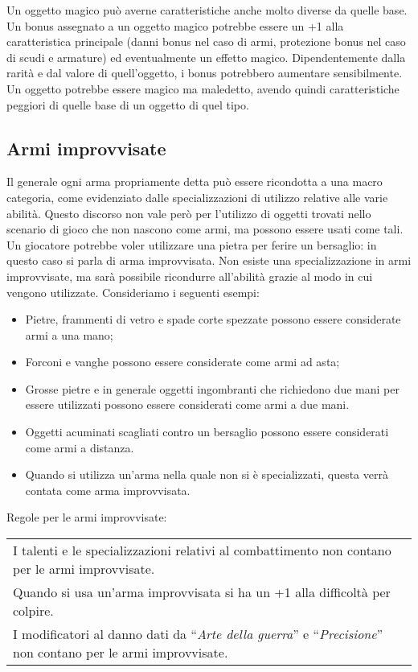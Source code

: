\documentclass[../manuale_main.tex]{subfiles}
\begin{document}
Un oggetto magico può averne caratteristiche anche molto diverse da quelle base.
Un bonus assegnato a un oggetto magico potrebbe essere un +1 alla caratteristica principale (danni bonus nel caso di armi, protezione bonus nel caso di scudi e armature) ed eventualmente un effetto magico.
Dipendentemente dalla rarità e dal valore di quell'oggetto, i bonus potrebbero aumentare sensibilmente.
Un oggetto potrebbe essere magico ma maledetto, avendo quindi caratteristiche peggiori di quelle base di un oggetto di quel tipo.


\clearpage
\subsection{Armi improvvisate}

Il generale ogni arma propriamente detta può essere ricondotta a una macro categoria, come evidenziato dalle specializzazioni di utilizzo relative alle varie abilità.
Questo discorso non vale però per l'utilizzo di oggetti trovati nello scenario di gioco che non nascono come armi, ma possono essere usati come tali. Un giocatore potrebbe voler utilizzare una pietra per ferire un bersaglio: in questo caso si parla di arma improvvisata.
Non esiste una specializzazione in armi improvvisate, ma sarà possibile ricondurre all'abilità grazie al modo in cui vengono utilizzate. Consideriamo i seguenti esempi:
\begin{itemize}
\item Pietre, frammenti di vetro e spade corte spezzate possono essere considerate armi a una mano;
\item Forconi e vanghe possono essere considerate come armi ad asta;
\item Grosse pietre e in generale oggetti ingombranti che richiedono due mani per essere utilizzati possono essere considerati come armi a due mani.
\item Oggetti acuminati scagliati contro un bersaglio possono essere considerati come armi a distanza.
\item Quando si utilizza un'arma nella quale non si è specializzati, questa verrà contata come arma improvvisata.
\end{itemize}
Regole per le armi improvvisate:\\
\renewcommand{\arraystretch}{1.5}
\begin{tabularx}{\linewidth}{X}
I talenti e le specializzazioni relativi al combattimento non contano per le armi improvvisate.\\
Quando si usa un'arma improvvisata si ha un +1 alla difficoltà per colpire.\\
I modificatori al danno dati da “\emph{Arte della guerra}” e “\emph{Precisione}” non contano per le armi improvvisate.\\
\end{tabularx}
\end{document}
